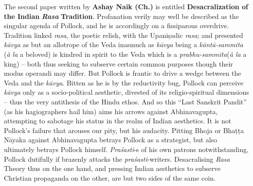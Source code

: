 The second paper written by {\bf Ashay Naik (Ch.)} is entitled {\bf Desacralization of the Indian} {\sl\bfseries Rasa} {\bf Tradition}. Profanation verily may well be described as the singular agenda of Pollock, and he is accordingly on a fissiparous overdrive. Tradition linked \textsl{rasa}, the poetic relish, with the Upaniṣadic \textsl{rasa}; and presented \textsl{kāvya} as but an allotrope of the Veda inasmuch as \textsl{kāvya} being a \textsl{kāntā-sammita} (\textsl{à la} a beloved) is kindred in spirit to the Veda which is a \textsl{prabhu-sammita}\break (\textsl{à la} a king) -- both thus seeking to subserve certain common purposes though their modus operandi may differ. But Pollock is frantic to drive a wedge between the Veda and the \textsl{kāvya}. Bitten as he is by the reductivity bug, Pollock can perceive \textsl{kāvya} only as a socio-political aesthetic, divested of its religio-spiritual dimensions -- thus the very antithesis of the Hindu ethos. And so this “Last Sanskrit Pandit” (as his hagiographers hail him) aims his arrows against Abhinavagupta, attempting to sabotage his status in the realm of Indian aesthetics. It is not Pollock's failure that arouses our pity, but his audacity. Pitting Bhoja or Bhaṭṭa Nāyaka against Abhinavagupta betrays Pollock as a strategist, but also ultimately betrays Pollock himself. \textsl{Praśasti}-s of his own patrons notwithstanding, Pollock dutifully if brazenly attacks the \textsl{praśasti}-writers. Desacralising \textsl{Rasa} Theory thus on the one hand, and pressing Indian aesthetics to subserve Christian propaganda on the other, are but two sides of the same coin.

